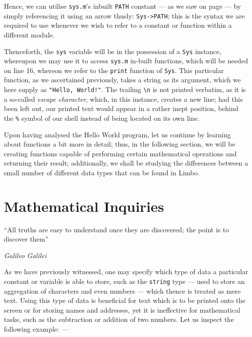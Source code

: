 \documentclass[a5paper,twoside,12pt]{report}
\begin{document}
Hence, we can utilise \texttt{sys.m}'s inbuilt \texttt{PATH} constant — as we saw on page \pageref{sys.m} — by simply referencing it using an arrow thusly: \texttt{Sys->PATH}; this is the syntax we are required to use whenever we wish to refer to a constant or function within a different module.

Thenceforth, the \texttt{sys} variable will be in the possession of a \texttt{Sys} instance, whereupon we may use it to access \texttt{sys.m} in-built functions, which will be needed on line 16, whereon we refer to the \texttt{print} function of \texttt{Sys}. This particular function, as we ascertained previously, takes a string as its argument, which we here supply as \texttt{"Hello, World!"}. The trailing \texttt{\textbackslash n} is not printed verbatim, as it is a so-called \textit{escape character}, which, in this instance, creates a new line; had this been left out, our printed text would appear in a rather inept position, behind the \texttt{\%} symbol of our shell instead of being located on its own line.

Upon having analysed the Hello World program, let us continue by learning about functions a bit more in detail; thus, in the following section, we will be creating functions capable of performing certain mathematical operations and returning their result; additionally, we shall be studying the differences between a small number of different data types that can be found in Limbo. 

\newpage

\chapter*{Mathematical Inquiries}
\epigraph{``All truths are easy to understand once they are discovered; the point is to discover them''}{\textit{Galileo Galilei}}

As we have previously witnessed, one may specify which type of data a particular constant or variable is able to store, such as the \texttt{string} type — used to store an aggregation of characters and even numbers — which thence is treated as mere text. Using this type of data is beneficial for text which is to be printed onto the screen or for storing names and addresses, yet it is ineffective for mathematical tasks, such as the subtraction or addition of two numbers. Let us inspect the following example: —
\end{document}
